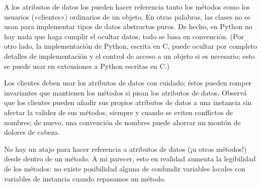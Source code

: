 \documentclass[a4,10pt,spanish]{sphinxmanual}
\begin{document}
\begin{sphinxVerbatim}[commandchars=\\\{\}]
 

  
 
  
  
 
\end{sphinxVerbatim}

\sphinxAtStartPar
A los atributos de datos los pueden hacer referencia tanto los métodos como los usuarios («clientes») ordinarios de un objeto.  En otras palabras, las clases no se usan para implementar tipos de datos abstractos puros.  De hecho, en Python no hay nada que haga cumplir el ocultar datos; todo se basa en convención.  (Por otro lado, la implementación de Python, escrita en C, puede ocultar por completo detalles de implementación y el control de acceso a un objeto si es necesario; esto se puede usar en extensiones a Python escritas en C.)

\sphinxAtStartPar
Los clientes deben usar los atributos de datos con cuidado; éstos pueden romper invariantes que mantienen los métodos si pisan los atributos de datos. Observá que los clientes pueden añadir sus propios atributos de datos a una instancia sin afectar la validez de sus métodos, siempre y cuando se eviten conflictos de nombres; de nuevo, una convención de nombres puede ahorrar un montón de dolores de cabeza.

\sphinxAtStartPar
No hay un atajo para hacer referencia a atributos de datos (¡u otros métodos!) desde dentro de un método.  A mi parecer, esto en realidad aumenta la legibilidad de los métodos: no existe posibilidad alguna de confundir variables locales con variables de instancia cuando repasamos un método.
\end{document}
